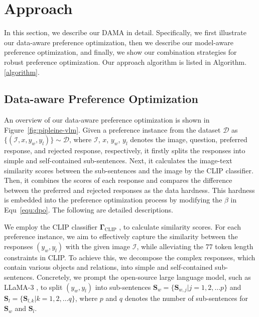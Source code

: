\section{Approach}
\label{sec:approach}
In this section, we describe our DAMA in detail. Specifically, we first illustrate our data-aware preference optimization, then we describe our model-aware preference optimization, and finally, we show our combination strategies for robust preference optimization. Our approach algorithm is listed in Algorithm. \ref{algorithm}.

\subsection{Data-aware Preference Optimization}
\label{subsec:Data-anchored Preference Optimization}
An overview of our data-aware preference optimization is shown in Figure~\ref{fig:pipleine-vlm}. Given a preference instance from the dataset $\mathcal{D}$ as $\{ (\mathcal{I}, x, y_{w}, y_{l})\} \sim \mathcal{D}$, where $\mathcal{I}$, $x$, $y_{w}$, $y_{l}$ denotes the image, question, preferred response, and rejected response, respectively, it firstly splits the responses into simple and self-contained sub-sentences. Next, it calculates the image-text similarity scores between the sub-sentences and the image by the CLIP classifier. Then, it combines the scores of each response and compares the difference between the preferred and rejected responses as the data hardness. This hardness is embedded into the preference optimization process by modifying the $\beta$ in Equ~\eqref{equ:dpo}.
The following are detailed descriptions.

We employ the CLIP classifier $\mathbf{\Gamma}_{\mathrm{CLIP}}$ \cite{CLIP}, to calculate similarity scores.
For each preference instance, we aim to effectively capture the similarity between the responses $(y_{w}, y_{l})$ with the given image $\mathcal{I}$, while alleviating the 77 token length constraints in CLIP. To achieve this, we decompose the complex responses, which contain various objects and relations, into simple and self-contained sub-sentences. 
Concretely, we prompt the open-source large language model, such as LLaMA-3 \cite{LLaMA3}, to split $(y_{w}, y_{l})$ into sub-sentences $\mathbf{S}_{w} = \{ \mathbf{S}_{w,j} | j = 1,2, \dots p\}$ and $\mathbf{S}_{l} = \{ \mathbf{S}_{l,k} | k = 1,2, \dots q\}$, where $p$ and $q$ denotes the number of sub-sentences for $\mathbf{S}_{w}$ and $\mathbf{S}_{l}$.

